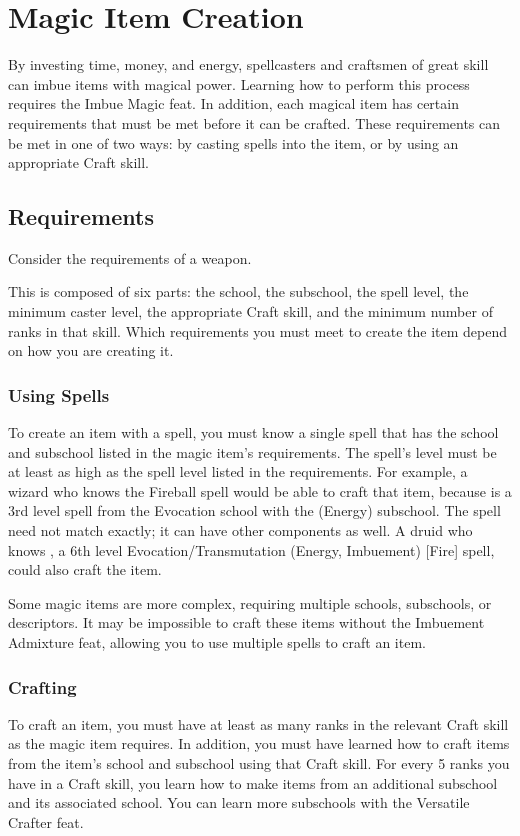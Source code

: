 \section{Magic Item Creation}

By investing time, money, and energy, spellcasters and craftsmen of great skill can imbue items with magical power. Learning how to perform this process requires the Imbue Magic feat. In addition, each magical item has certain requirements that must be met before it can be crafted. These requirements can be met in one of two ways: by casting spells into the item, or by using an appropriate Craft skill.

\subsection{Requirements}
Consider the requirements of a  weapon.


This is composed of six parts: the school, the subschool, the spell level, the minimum caster level, the appropriate Craft skill, and the minimum number of ranks in that skill. Which requirements you must meet to create the item depend on how you are creating it.

\subsubsection{Using Spells}
To create an item with a spell, you must know a single spell that has the school and subschool listed in the magic item's requirements. The spell's level must be at least as high as the spell level listed in the requirements. For example, a wizard who knows the Fireball spell would be able to craft that item, because  is a 3rd level spell from the Evocation school with the (Energy) subschool. The spell need not match exactly; it can have other components as well. A druid who knows , a 6th level Evocation/Transmutation (Energy, Imbuement) [Fire] spell, could also craft the item.

Some magic items are more complex, requiring multiple schools, subschools, or descriptors. It may be impossible to craft these items without the Imbuement Admixture feat, allowing you to use multiple spells to craft an item.

\subsubsection{Crafting}
To craft an item, you must have at least as many ranks in the relevant Craft skill as the magic item requires. In addition, you must have learned how to craft items from the item's school and subschool using that Craft skill. For every 5 ranks you have in a Craft skill, you learn how to make items from an additional subschool and its associated school. You can learn more subschools with the Versatile Crafter feat.

